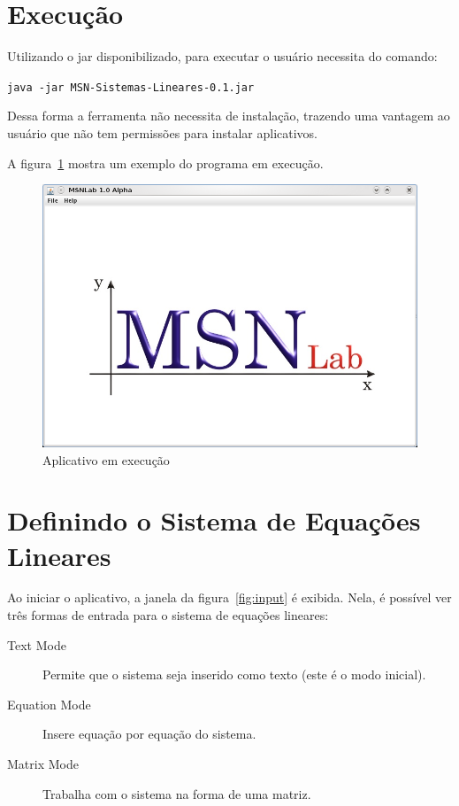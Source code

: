 \documentclass[a4paper,10pt]{report}
\begin{document}
\section{Execução}

Utilizando o jar disponibilizado, para executar o usuário necessita do comando:

\texttt{java -jar MSN-Sistemas-Lineares-0.1.jar}

Dessa forma a ferramenta não necessita de instalação, trazendo uma vantagem ao
usuário que não tem permissões para instalar aplicativos.

A figura~\ref{fig:intro} mostra um exemplo do programa em execução.

\begin{figure}[ht]
 \centering
 \includegraphics[scale=0.5, bb=0 0 538 377]{screen-1-intro.png}
 \caption{Aplicativo em execução}
 \label{fig:intro}
\end{figure}

\section{Definindo o Sistema de Equações Lineares}

Ao iniciar o aplicativo, a janela da figura~\ref{fig:input} é exibida. Nela, é possível ver três formas de entrada para o sistema de equações lineares:

\begin{description}
 \item[Text Mode] Permite que o sistema seja inserido como texto (este é o modo inicial).
 \item[Equation Mode] Insere equação por equação do sistema.
 \item[Matrix Mode] Trabalha com o sistema na forma de uma matriz.
\end{description}
\end{document}
